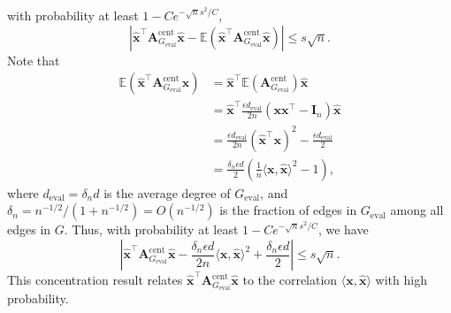 \documentclass[11pt, titlepage]{article} %
\numberwithin{equation}{section}
\theoremstyle{definition}
\numberwithin{theorem}{section}
\numberwithin{lemma}{section}
\numberwithin{corollary}{section}
\numberwithin{proposition}{section}
\numberwithin{definition}{section}
\numberwithin{remark}{section}
\begin{document}
with probability at least $1 - Ce^{-\sqrt{n}s^2/C}$,
\[
\left|\hat{\bm{x}}^\top \bm{A}_{G_\mathrm{eval}}^\mathrm{cent} \hat{\bm{x}} 
- \mathbb{E}\left(\hat{\bm{x}}^\top \bm{A}_{G_\mathrm{eval}}^\mathrm{cent} \hat{\bm{x}}\right)\right| \leq s \sqrt{n}.
\]
Note that
\begin{align*}
\mathbb{E}\left(\hat{\bm{x}}^\top \bm{A}_{G_\mathrm{eval}}^\mathrm{cent} \hat{\bm{x}}\right)
&= \hat{\bm{x}}^\top \mathbb{E}\left(\bm{A}_{G_\mathrm{eval}}^\mathrm{cent}\right) \hat{\bm{x}}\\
&= \hat{\bm{x}}^\top \frac{\epsilon d_\mathrm{eval}}{2n} \left(\bm{x}\bm{x}^\top - \bm{I}_n\right) \hat{\bm{x}}\\
&= \frac{\epsilon d_\mathrm{eval}}{2n} (\hat{\bm{x}}^\top \bm{x})^2 - \frac{\epsilon d_\mathrm{eval}}{2}\\
&= \frac{\delta_n \epsilon d}{2} \left(\frac{1}{n} \langle \bm{x}, \hat{\bm{x}} \rangle^2 - 1\right),
\end{align*}
where $d_\mathrm{eval} = \delta_n d$ is the average degree of $G_\mathrm{eval}$, and
$\delta_n = n^{-1/2}/(1 + n^{-1/2}) = O(n^{-1/2})$ is the fraction of edges in $G_\mathrm{eval}$ among all edges in $G$.
Thus, with probability at least $1 - Ce^{-\sqrt{n}s^2/C}$, we have
\begin{equation}
\label{eqn:conc}
  \left|\hat{\bm{x}}^\top \bm{A}_{G_\mathrm{eval}}^\mathrm{cent} \hat{\bm{x}} 
  - \frac{\delta_n \epsilon d}{2n} \langle\bm{x}, \hat{\bm{x}}\rangle^2 + \frac{\delta_n \epsilon d}{2}\right| \leq s \sqrt{n}.
\end{equation}
This concentration result relates $\hat{\bm{x}}^\top \bm{A}_{G_\mathrm{eval}}^\mathrm{cent} \hat{\bm{x}}$
to the correlation $\langle\bm{x}, \hat{\bm{x}}\rangle$ with high probability.
\end{document}
